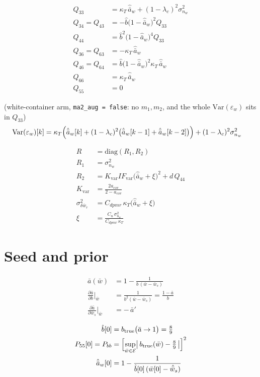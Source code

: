 \documentclass[11pt,a4paper,fontset=none]{ctexart}
\newcommand{\ba}{\bar{a}}
\newcommand{\bw}{\bar{w}}
\begin{document}
\begin{align*}
Q_{33} &= \kappa_T\,\hat{\ba}_w + (1-\lambda_c)^{2}\sigma^{2}_{n_w} \\
Q_{34} = Q_{43} &= -\hat{b}\bigl(1-\hat{\ba}_w\bigr)^{2}Q_{33} \\
Q_{44} &= \hat{b}^{2}\bigl(1-\hat{\ba}_w\bigr)^{4}Q_{33} \\
Q_{36} = Q_{63} &= -\kappa_T\,\hat{\ba}_w \\
Q_{46} = Q_{64} &= \hat{b}\bigl(1-\hat{\ba}_w\bigr)^{2}\kappa_T\,\hat{\ba}_w \\
Q_{66} &= \kappa_T\,\hat{\ba}_w \\
Q_{55} &= 0
\end{align*}

(white-container arm, \texttt{ma2\_aug = false}: no $m_1, m_2$, and the whole
$\mathrm{Var}(\varepsilon_w)$ sits in $Q_{33}$)
\begin{align*}
\mathrm{Var}(\varepsilon_w)[k] &= \kappa_T\Bigl(\hat{\ba}_w[k]
  + (1-\lambda_c)^{2}\bigl(\hat{\ba}_w[k-1] + \hat{\ba}_w[k-2]\bigr)\Bigr)
  + (1-\lambda_c)^{2}\sigma^{2}_{n_w}
\end{align*}

\begin{align*}
R &= \mathrm{diag}(R_1, R_2) \\
R_1 &= \sigma^{2}_{n_w} \\
R_2 &= K_{\mathrm{var}} IF_{\mathrm{var}}\bigl(\hat{\ba}_w+\xi\bigr)^{2} + d\,Q_{44} \\
K_{\mathrm{var}} &= \frac{2a_{\mathrm{cov}}}{2-a_{\mathrm{cov}}} \\
\sigma^{2}_{\delta\bw_r} &= C_{dpmr}\,\kappa_T\bigl(\hat{\ba}_w+\xi\bigr) \\
\xi &= \frac{C_n\,\sigma^{2}_{n_w}}{C_{dpmr}\,\kappa_T}
\end{align*}

\section*{Seed and prior}

\begin{align*}
\ba(\bw) &= 1 - \frac{1}{b\,(\bw-\bw_s)} \\
\frac{\partial \ba}{\partial b}\bigg|_{\bw}
  &= \frac{1}{b^{2}(\bw-\bw_s)} = \frac{1-\ba}{b} \\
\frac{\partial \ba}{\partial \bw_s}\bigg|_{\bw} &= -\,\ba'
\end{align*}

\begin{align*}
\hat{b}[0] &= b_{\mathrm{true}}\bigl(\ba \to 1\bigr) = \tfrac{8}{9} \\
P_{55}[0] = P_{bb} &= \Bigl[\sup_{\bw\in\mathcal{E}}
  \bigl|\,b_{\mathrm{true}}(\bw) - \tfrac{8}{9}\,\bigr|\Bigr]^{2} \\
\hat{\ba}_w[0] &= 1 - \frac{1}{\hat{b}[0]\,(\bw[0]-\hat{\bw}_s)}
\end{align*}
\end{document}
